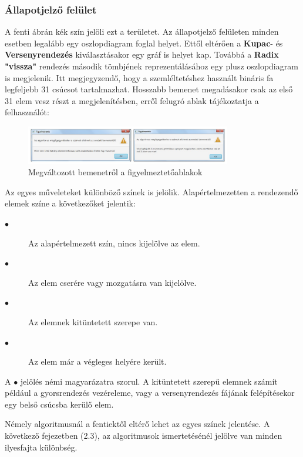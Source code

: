 \documentclass{elteikthesis}
\begin{document}
\subsubsection{Állapotjelző felület}
A fenti ábrán kék szín jelöli ezt a területet.
Az állapotjelző felületen minden esetben legalább egy oszlopdiagram foglal helyet. Ettől eltérően a \textbf{Kupac}- és \textbf{Versenyrendezés} kiválasztásakor egy gráf is helyet kap. Továbbá a \textbf{Radix "vissza"} rendezés második tömbjének reprezentálásához egy plusz oszlopdiagram is megjelenik. Itt megjegyzendő, hogy a szemléltetéshez használt bináris fa legfeljebb 31 csúcsot tartalmazhat. Hosszabb bemenet megadásakor csak az első 31 elem vesz részt a megjelenítésben, erről felugró ablak tájékoztatja a felhasználót:
 \begin{figure}[H]
 	\centering
 	\includegraphics[width=0.8\textwidth]{pics/splittedinput.jpg}
 	\caption{Megváltozott bemenetről a figyelmeztetőablakok}
 \end{figure}

\par Az egyes műveleteket különböző színek is jelölik. Alapértelmezetten a rendezendő elemek színe a következőket jelentik:\par
\begin{description}
	\item[\textcolor{default}{\Huge$\bullet$}] Az alapértelmezett szín, nincs kijelölve az elem.
	\item[\textcolor{swap}{\Huge$\bullet$}] Az elem cserére vagy mozgatásra van kijelölve.
	\item[\textcolor{select}{\Huge$\bullet$}] Az elemnek kitüntetett szerepe van.
	\item[\textcolor{done}{\Huge$\bullet$}] Az elem már a végleges helyére került.
\end{description}
A \textcolor{select}{\Huge$\bullet$} jelölés némi magyarázatra szorul. A kitüntetett szerepű elemnek számít például a gyorsrendezés vezéreleme, vagy a versenyrendezés fájának felépítésekor egy belső csúcsba kerülő elem.\par
Némely algoritmusnál a fentiektől eltérő lehet az egyes színek jelentése. A következő fejezetben (2.3), az algoritmusok ismertetésénél jelölve van minden ilyesfajta különbség.
\end{document}
